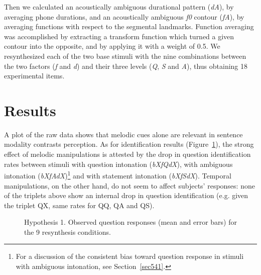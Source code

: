 Then we calculated an acoustically ambiguous durational pattern (\textit{dA}), by averaging phone durations, and an acoustically ambiguous \textit{f0} contour (\textit{fA}), by averaging functions with respect to the segmental landmarks. Function averaging was accomplished by extracting a transform function which turned a given contour into the opposite, and by applying it with a weight of 0.5. We resynthesized each of the two base stimuli with the nine combinations between the two factors (\textit{f} and \textit{d}) and their three levels (\textit{Q}, \textit{S} and \textit{A}), thus obtaining 18 experimental items. 

\section{Results}\label{sec53}
A plot of the raw data shows that melodic cues alone are relevant in sentence modality contrasts perception.
As for identification results (Figure~\ref{fig502}), the strong effect of melodic manipulations is attested by the drop in question identification rates between stimuli with question intonation (\textit{bXfQdX}), with ambiguous intonation (\textit{bXfAdX})\footnote{For a discussion of the consistent bias toward question response in stimuli with ambiguous intonation, see Section~\ref{sec541}.} and with statement intonation (\textit{bXfSdX}). Temporal manipulations, on the other hand, do not seem to affect subjects' responses: none of the triplets above show an internal drop in question identification (e.g. given the triplet QX, same rates for QQ, QA and QS). 

\begin{figure}
\centering
{}
\caption{Hypothesis 1. Observed question responses (mean and error bars) for the 9 resynthesis conditions.}
\label{fig502}\end{figure}

